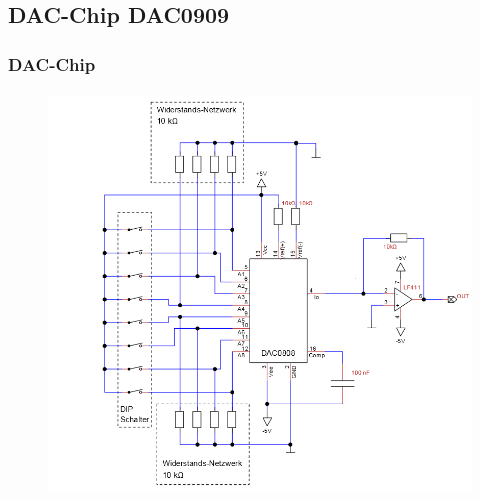 \subsection{DAC-Chip DAC0909} %
\label{sub:DAC-Chip_DAC0909}

\begin{frame}
    \frametitle{DAC-Chip}
    \framesubtitle{}
    \begin{figure}[H]
        \begin{center}
                \includegraphics[scale=0.38]{./img/schaltung/dac_0.png}
        \end{center}
    \end{figure}    
\end{frame}

